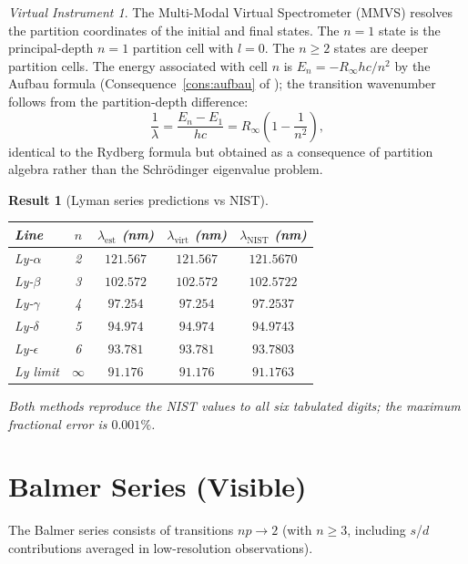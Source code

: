 \documentclass[twocolumn,11pt,a4paper]{article}
\theoremstyle{stmtstyle}
\newtheorem{result}{Result}
\theoremstyle{definition}
\theoremstyle{remark}
\newtheorem*{instrument}{Virtual Instrument}
\begin{document}
\begin{instrument}
The Multi-Modal Virtual Spectrometer (MMVS) resolves the partition coordinates of the initial and final states. The $n=1$ state is the principal-depth $n=1$ partition cell with $l=0$. The $n\geq 2$ states are deeper partition cells. The energy associated with cell $n$ is $E_{n}=-R_{\infty}hc/n^{2}$ by the Aufbau formula (Consequence~\ref{cons:aufbau} of \citet{sachikonye2026bps}); the transition wavenumber follows from the partition-depth difference:
\begin{equation}
\frac{1}{\lambda}=\frac{E_{n}-E_{1}}{hc}=R_{\infty}\left(1-\frac{1}{n^{2}}\right),
\end{equation}
identical to the Rydberg formula but obtained as a consequence of partition algebra rather than the Schr\"odinger eigenvalue problem.
\end{instrument}

\begin{result}[Lyman series predictions vs NIST]
\label{res:lyman}
\begin{center}\small
\begin{tabular}{lcccc}
\toprule
Line & $n$ & $\lambda_{\mathrm{est}}$ (nm) & $\lambda_{\mathrm{virt}}$ (nm) & $\lambda_{\mathrm{NIST}}$ (nm)\\
\midrule
Ly-$\alpha$ & 2 & $121.567$ & $121.567$ & $121.5670$\\
Ly-$\beta$  & 3 & $102.572$ & $102.572$ & $102.5722$\\
Ly-$\gamma$ & 4 & $97.254$  & $97.254$  & $97.2537$\\
Ly-$\delta$ & 5 & $94.974$  & $94.974$  & $94.9743$\\
Ly-$\epsilon$ & 6 & $93.781$ & $93.781$ & $93.7803$\\
Ly limit & $\infty$ & $91.176$ & $91.176$ & $91.1763$\\
\bottomrule
\end{tabular}
\end{center}
Both methods reproduce the NIST values to all six tabulated digits; the maximum fractional error is $0.001\%$.
\end{result}

\section{Balmer Series (Visible)}
\label{sec:hbalmer}

The Balmer series consists of transitions $np \to 2$ (with $n \geq 3$, including $s$/$d$ contributions averaged in low-resolution observations).
\end{document}
